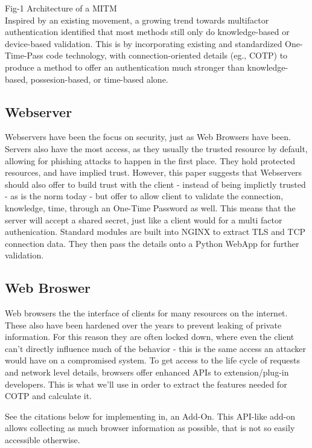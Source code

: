 \documentclass[a4paper, 11pt]{article} 				%
\begin{document}
Fig-1 Architecture of a MITM\\ 

Inspired by an existing movement, a growing trend towards multifactor authentication
identified that most methods still only do knowledge-based or device-based validation. This is by incorporating existing and standardized One-Time-Pass code technology, with connection-oriented details (eg., COTP) to produce a method to offer an authentication much stronger than knowledge-based, possesion-based, or time-based alone. 

\subsection{Webserver}
Webservers have been the focus on security, just as Web Browsers have been. Servers also have the most access, as they usually the trusted resource by default, allowing for phishing attacks to happen in the first place. They hold protected resources, and have implied trust. However, this paper suggests that Webservers should also offer to build trust with the client - instead of being implictly trusted - as is the norm today - but offer to allow client to validate the connection, knowledge, time, through an One-Time Password as well. This means that the server will accept a shared secret, just like a client would for a multi factor authenication. Standard modules are built into NGINX to extract TLS and TCP connection data. They then pass the details onto a Python WebApp for further validation.

\subsection{Web Broswer}
Web browsers the the interface of clients for many resources on the internet. These also have been hardened over the years to prevent leaking of private information. For this reason they are often locked down, where even the client can't directly influence much of the behavior - this is the same access an attacker would have on a compromised system. To get access to the life cycle of requests and network level details, browsers offer enhanced APIs to extension/plug-in developers. This is what we'll use in order to extract the features needed for COTP and calculate it.

\noindent
[10][11][12][13]See the citations below for implementing in, an Add-On. This API-like add-on allows collecting as much browser information as possible, that is not so easily accessible otherwise.\\
\end{document}
